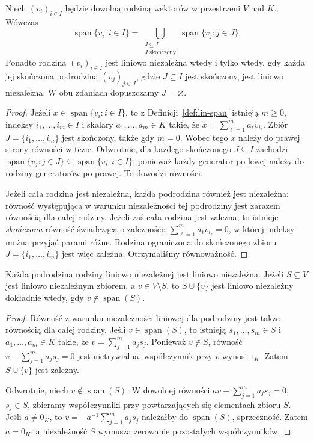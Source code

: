 \begin{stwierdzenie}
\label{prop:lin-skonczony-charakter}
Niech \((v_i)_{i\in I}\) będzie dowolną
rodziną wektorów w przestrzeni \(V\) nad \(K\).
Wówczas
\[
 \operatorname{span}\{v_i:i\in I\}
 =\bigcup_{\substack{J\subseteq I\\J\text{ skończony}}}
  \operatorname{span}\{v_j:j\in J\}.
\]
Ponadto rodzina \((v_i)_{i\in I}\)
jest liniowo niezależna wtedy i tylko wtedy,
gdy każda jej skończona podrodzina
\((v_j)_{j\in J}\), gdzie \(J\subseteq I\)
jest skończony, jest liniowo niezależna.
W obu zdaniach dopuszczamy \(J=\varnothing\).
\end{stwierdzenie}
\begin{proof}
Jeżeli \(x\in\operatorname{span}\{v_i:i\in I\}\),
to z Definicji~\ref{def:lin-span} istnieją
\(m\geq0\), indeksy \(i_1,\ldots,i_m\in I\)
i skalary \(a_1,\ldots,a_m\in K\) takie, że
\(x=\sum_{\ell=1}^m a_\ell v_{i_\ell}\).
Zbiór \(J=\{i_1,\ldots,i_m\}\)
jest skończony, także gdy \(m=0\).
Wobec tego \(x\) należy do prawej strony
równości w tezie.
Odwrotnie, dla każdego skończonego
\(J\subseteq I\) zachodzi
\(\operatorname{span}\{v_j:j\in J\}
\subseteq\operatorname{span}\{v_i:i\in I\}\),
ponieważ każdy generator po lewej
należy do rodziny generatorów po prawej.
To dowodzi równości.

Jeżeli cała rodzina jest niezależna,
każda podrodzina również jest niezależna:
równość występująca w warunku niezależności
tej podrodziny jest zarazem równością
dla całej rodziny.
Jeżeli zaś cała rodzina jest zależna,
to istnieje \emph{skończona} równość
świadcząca o zależności: \(\sum_{\ell=1}^m
a_\ell v_{i_\ell}=0\), w której
indeksy można przyjąć parami różne.
Rodzina ograniczona do skończonego zbioru
\(J=\{i_1,\ldots,i_m\}\) jest więc zależna.
Otrzymaliśmy równoważność.
\end{proof}

\begin{wniosek}
\label{cor:lin-podrodziny}
Każda podrodzina rodziny liniowo niezależnej jest
liniowo niezależna. Jeżeli \(S\subseteq V\)
jest liniowo niezależnym zbiorem, a \(v\in V\setminus S\),
to \(S\cup\{v\}\) jest liniowo niezależny
dokładnie wtedy, gdy \(v\notin\operatorname{span}(S)\).
\end{wniosek}
\begin{proof}
Równość z warunku niezależności liniowej
dla podrodziny jest także równością
dla całej rodziny.
Jeśli \(v\in\operatorname{span}(S)\), to istnieją
\(s_1,\ldots,s_m\in S\) i \(a_1,\ldots,a_m\in K\)
takie, że \(v=\sum_{j=1}^m a_js_j\).
Ponieważ \(v\notin S\), równość
\(v-\sum_{j=1}^m a_js_j=0\)
jest nietrywialna: współczynnik przy \(v\)
wynosi \(1_K\). Zatem \(S\cup\{v\}\) jest zależny.

Odwrotnie, niech \(v\notin\operatorname{span}(S)\).
W dowolnej równości
\(av+\sum_{j=1}^m a_js_j=0\), \(s_j\in S\),
zbieramy współczynniki przy powtarzających się
elementach zbioru \(S\). Jeśli \(a\neq0_K\),
to \(v=-a^{-1}\sum_{j=1}^m a_js_j\)
należałby do \(\operatorname{span}(S)\), sprzeczność.
Zatem \(a=0_K\), a niezależność \(S\)
wymusza zerowanie pozostałych współczynników.
\end{proof}

